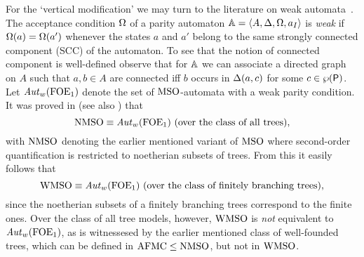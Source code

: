 For the `vertical modification' we may turn to the literature on weak automata~\cite{MullerSaoudiSchupp92}.
The acceptance condition $\Omega$ of a parity automaton $\mathbb{A} =
\langle{A, \Delta, \Omega, a_I}\rangle$ is \emph{weak} if $\Omega(a) = \Omega(a')$ whenever
the states $a$ and $a'$ belong to the same strongly connected component
(SCC) of the automaton. To see that the notion of connected component is well-defined
observe that for $\mathbb{A}$ we can associate a directed graph on $A$
such that $a,b \in A$ are connected iff $b$ occurs in $\Delta(a,c)$ for some $c \in \wp(\mathsf{P})$.
%
Let $\mathit{Aut}_{w}(\mathrm{FOE}_1)$ denote the set of $\mathrm{MSO}$-automata with a weak parity
condition.
It was proved in \cite{Zanasi:Thesis:2012} (see also \cite{DBLP:conf/lics/FacchiniVZ13}) that
\begin{equation*}
\nmso \equiv \AutW(\ofoe) \text{ (over the class of all trees)},
\end{equation*}
with $\mathrm{NMSO}$ denoting the earlier mentioned variant of $\mathrm{MSO}$ %
where second-order quantification is restricted to noetherian subsets of trees.
From this it easily follows that
\begin{equation*}
\wmso \equiv \AutW(\ofoe) \text{ (over the class of finitely
branching trees)},
\end{equation*}
since the noetherian subsets of a finitely branching trees correspond to the
finite ones.
Over the class of all tree models, however, $\mathrm{WMSO}$ is \emph{not} equivalent
to $\mathit{Aut}_{w}(\mathrm{FOE}_1)$, %
as is witnessesed by the earlier mentioned
class of well-founded trees, which can be defined in $\mathrm{AFMC} \leq \mathrm{NMSO}$,
but not in $\mathrm{WMSO}$.

